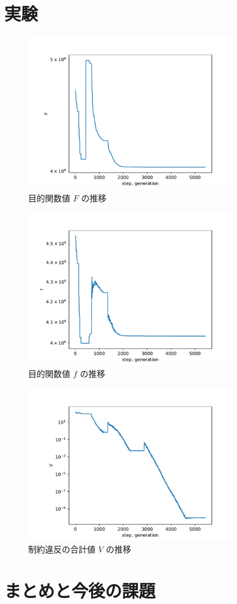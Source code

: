 \documentclass[twocolumn]{jarticle}
\begin{document}
\section{実験}
\begin{figure}
    \centering
    \label{img_F}
    \includegraphics[width=9cm]{img_F.pdf}
    \caption{目的関数値 $F$ の推移}
\end{figure}
\begin{figure}
    \centering
    \label{img_f}
    \includegraphics[width=9cm]{img_f.pdf}
    \caption{目的関数値 $f$ の推移}
\end{figure}
\begin{figure}
    \centering
    \label{img_V}
    \includegraphics[width=9cm]{img_V.pdf}
    \caption{制約違反の合計値 $V$ の推移}
\end{figure}

\section{まとめと今後の課題}





\end{document}
